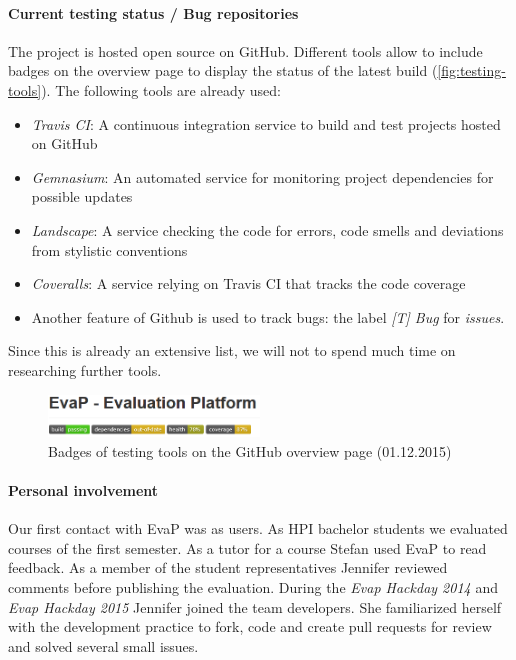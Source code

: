 \paragraph{Current testing status / Bug repositories}
The project is hosted open source on GitHub.
Different tools allow to include badges on the overview page to display the status of the latest build (\autoref{fig:testing-tools}).
The following tools are already used:
\begin{itemize}
    \item \emph{Travis CI}: 
    A continuous integration service to build and test projects hosted on GitHub
    \item \emph{Gemnasium}:
     An automated service for monitoring project dependencies for possible updates
     \item \emph{Landscape}:
     A service checking the code for errors, code smells and deviations from stylistic conventions
     \item  \emph{Coveralls}:
     A service relying on Travis CI that tracks the code coverage
     \item 
     Another feature of Github is used to track bugs: the label \emph{[T] Bug} for \emph{issues}.
\end{itemize}
Since this is already an extensive list, we will not to spend much time on researching further tools. 
\begin{figure}[h]
    \centering
    \includegraphics[width=0.5\textwidth, keepaspectratio]{graphics/testing-tools-github}
    \caption{Badges of testing tools on the GitHub overview page (01.12.2015)}
    \label{fig:testing-tools}
\end{figure}


\paragraph{Personal involvement}
Our first contact with EvaP was as users. 
As HPI bachelor students we evaluated courses of the first semester.
As a tutor for a course Stefan used EvaP to read feedback.
As a member of the student representatives Jennifer reviewed comments before publishing the evaluation.
During the \emph{Evap Hackday 2014} and \emph{Evap Hackday 2015} Jennifer joined the team developers.
She familiarized herself with the development practice to fork, code and create pull requests for review and solved several small issues.
